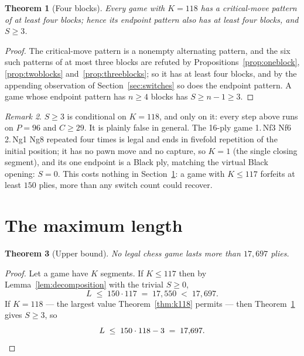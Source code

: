 \documentclass[11pt]{article}
\newtheorem{theorem}{Theorem}[section]
\theoremstyle{definition}
\theoremstyle{remark}
\newtheorem{remark}[theorem]{Remark}
\theoremstyle{plain}
\begin{document}
\begin{theorem}[Four blocks]\label{thm:s3}
Every game with $K = 118$ has a critical-move pattern of at least four
blocks; hence its endpoint pattern also has at least four blocks, and
$S \ge 3$.
\end{theorem}

\begin{proof}
The critical-move pattern is a nonempty alternating pattern, and the
six such patterns of at most three blocks are refuted by
Propositions~\ref{prop:oneblock}, \ref{prop:twoblocks}
and~\ref{prop:threeblocks}; so it has at least four blocks, and by the
appending observation of Section~\ref{sec:switches} so does the
endpoint pattern. A game whose endpoint pattern has $n \ge 4$ blocks
has $S \ge n - 1 \ge 3$.
\end{proof}

\begin{remark}\label{rem:notglobal}
$S \ge 3$ is conditional on $K = 118$, and only on it: every step above
runs on $P = 96$ and $C \ge 29$. It is plainly false in general. The
16-ply game \textup{1.\,Nf3 Nf6 2.\,Ng1 Ng8} repeated four times is legal
and ends in fivefold repetition of the initial position; it has no pawn
move and no capture, so $K = 1$ (the single closing segment), and its one
endpoint is a Black ply, matching the virtual Black opening: $S = 0$. This
costs nothing in Section~\ref{sec:main}: a game with $K \le 117$ forfeits
at least $150$ plies, more than any switch count could recover.
\end{remark}

\section{The maximum length}\label{sec:main}

\begin{theorem}[Upper bound]\label{thm:main}
No legal chess game lasts more than $17{,}697$ plies.
\end{theorem}

\begin{proof}
Let a game have $K$ segments. If $K \le 117$ then by
Lemma~\ref{lem:decomposition} with the trivial $S \ge 0$,
\[
  L \;\le\; 150 \cdot 117 \;=\; 17{,}550 \;<\; 17{,}697 .
\]
If $K = 118$ --- the largest value Theorem~\ref{thm:k118} permits --- then
Theorem~\ref{thm:s3} gives $S \ge 3$, so
\[
  L \;\le\; 150 \cdot 118 - 3 \;=\; 17{,}697 . \qedhere
\]
\end{proof}
\end{document}
